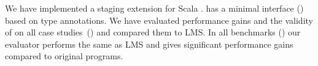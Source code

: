 We have implemented a staging extension for Scala \tool.
 \tool has a minimal interface () based on type annotations.
 We have evaluated performance gains and the validity of \tool on all case
 studies~() and compared them to LMS. In all benchmarks ()
 our evaluator performs the same as LMS and gives significant performance gains compared to original programs.
